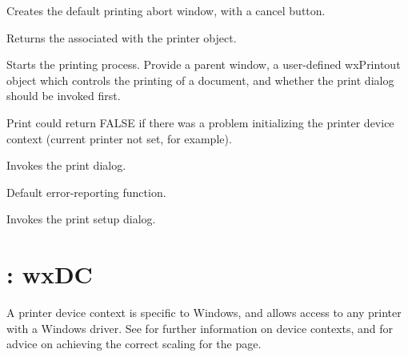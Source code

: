 Creates the default printing abort window, with a cancel button.



Returns the  associated with the printer object.



Starts the printing process. Provide a parent window, a user-defined wxPrintout object which controls
the printing of a document, and whether the print dialog should be invoked first.

Print could return FALSE if there was a problem initializing the printer device context
(current printer not set, for example).



Invokes the print dialog.



Default error-reporting function.



Invokes the print setup dialog.

\section{: wxDC}\label{wxprinterdc}

A printer device context is specific to Windows, and allows access to
any printer with a Windows driver. See  for further information
on device contexts, and  for advice on
achieving the correct scaling for the page.



